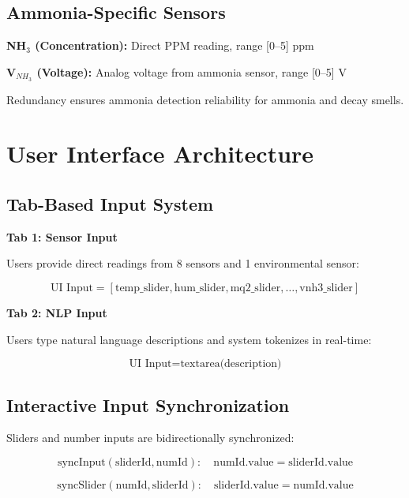 \documentclass[10pt]{article}
\begin{document}
\subsection{Ammonia-Specific Sensors}

\textbf{NH$_3$ (Concentration):} Direct PPM reading, range [0–5] ppm

\textbf{V$_{NH_3}$ (Voltage):} Analog voltage from ammonia sensor, range [0–5] V

Redundancy ensures ammonia detection reliability for ammonia and decay smells.


\section{User Interface Architecture}

\subsection{Tab-Based Input System}

\textbf{Tab 1: Sensor Input}

Users provide direct readings from 8 sensors and 1 environmental sensor:

\[
\text{UI Input} = [\text{temp\_slider}, \text{hum\_slider}, \text{mq2\_slider}, \ldots, \text{vnh3\_slider}]
\]

\textbf{Tab 2: NLP Input}

Users type natural language descriptions and system tokenizes in real-time:

\[
\text{UI Input} = \text{textarea(description)}
\]

\subsection{Interactive Input Synchronization}

Sliders and number inputs are bidirectionally synchronized:

\begin{equation}
\text{syncInput}(\text{sliderId}, \text{numId}):
\quad \text{numId.value} = \text{sliderId.value}
\end{equation}

\begin{equation}
\text{syncSlider}(\text{numId}, \text{sliderId}):
\quad \text{sliderId.value} = \text{numId.value}
\end{equation}
\end{document}

